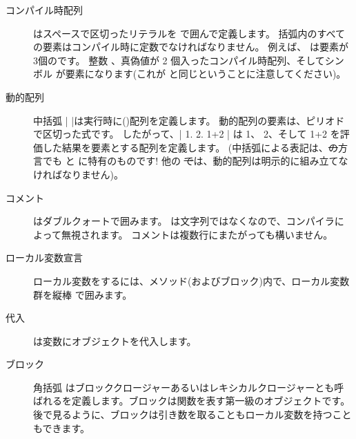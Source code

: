 \documentclass[a4paper,10pt,twoside]{book}
\begin{document}
\begin{description}
\item[コンパイル時配列] はスペースで区切ったリテラルを \ct{#( )} で囲んで定義します。
		括弧内のすべての要素はコンパイル時に定数でなければなりません。
		例えば、 は要素が 3個のです。 整数 、真偽値が 2 個入ったコンパイル時配列、そしてシンボル  が要素になります(これが  と同じということに注意してください)。

\item[動的配列] 中括弧 \ct|{ }|は実行時に()配列を定義します。
		動的配列の要素は、ピリオドで区切った式です。
		したがって、\ct|{ 1. 2. 1+2 }| は 1、 2、そして 1+2 を評価した結果を要素とする配列を定義します。
		(中括弧による表記は、\st の方言でも \pharo と \squeak に特有のものです!
		他の \st では、動的配列は明示的に組み立てなければなりません)。

\item[コメント] はダブルクォートで囲みます。
		 は文字列ではなくなので、\pharo コンパイラによって無視されます。
		コメントは複数行にまたがっても構いません。
		
\item[ローカル変数宣言] ローカル変数をするには、メソッド(およびブロック)内で、ローカル変数群を縦棒 \ct{| |} で囲みます。

\item[代入] \ct{:=} は変数にオブジェクトを代入します。

\item[ブロック] 角括弧 \ct{[ ]} はブロッククロージャーあるいはレキシカルクロージャーとも呼ばれるを定義します。ブロックは関数を表す第一級のオブジェクトです。
		後で見るように、ブロックは引き数を取ることもローカル変数を持つこともできます。


\end{description}
\end{document}
